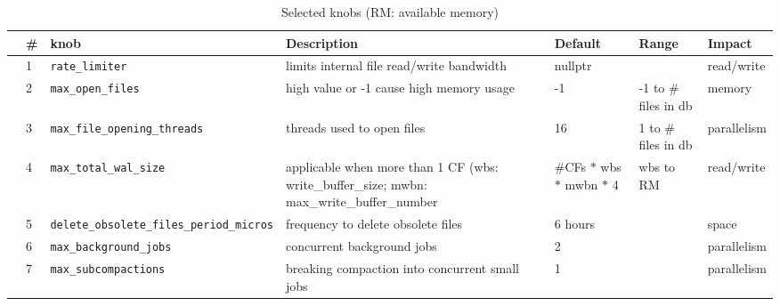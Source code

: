 \begin{table}
    \small
    \centering
    \caption{Selected knobs (RM: available memory)}\label{tab:methods}
    \vspace{-1.5em}
    \begin{tabular}{l@{}llp{6cm}p{2cm}p{2cm}l}
        \toprule
        & \textbf{\#} & \textbf{knob} & \textbf{Description} & \textbf{Default} & \textbf{Range} & \textbf{Impact} \\
        \midrule
        & 1 & \texttt{rate\_limiter} & limits internal file read/write bandwidth & nullptr &  & read/write \\
        \midrule
        & 2 & \texttt{max\_open\_files} & high value or -1 cause high memory usage & -1 & -1 to \# files in db &  memory \\
        \midrule
        & 3 & \texttt{max\_file\_opening\_threads} & threads used to open files & 16 & 1 to \# files in db &  parallelism \\
        \midrule
        & 4 & \texttt{max\_total\_wal\_size} & applicable when more than 1 CF (wbs: write\_buffer\_size; mwbn: max\_write\_buffer\_number & \#CFs $*$ wbs $*$ mwbn $*$ 4 & wbs to RM & read/write \\
        \midrule
        & 5 & \texttt{delete\_obsolete\_files\_period\_micros} & frequency to delete obsolete files & 6 hours &  & space \\
        \midrule
        & 6 & \texttt{max\_background\_jobs} & concurrent background jobs & 2 &  & parallelism \\
        \midrule
        & 7 & \texttt{max\_subcompactions} & breaking compaction into concurrent small jobs & 1 &  & parallelism \\
        \bottomrule
    \end{tabular}
\end{table}








\renewcommand{\arraystretch}{1.12}
\setlength{\tabcolsep}{4pt}

\newcommand{\optag}[2]{%
  \begingroup\setlength{\fboxsep}{1pt}\colorbox{#1}{\scriptsize\strut #2}\endgroup%
}

